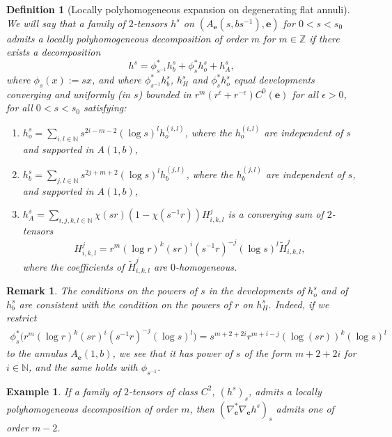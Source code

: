 \documentclass[12pt]{article}
\newtheorem{defn}[thm]{Definition}
\newtheorem{exmp}[thm]{Example}
\newtheorem{rem}[thm]{Remark}
\begin{document}
 \begin{defn}[Locally polyhomogeneous expansion on degenerating flat annuli]\label{homog expan annulus}
        We will say that a family of $2$-tensors $h^s$ on $(A_\mathbf{e}(s,bs^{-1}),\mathbf{e})$ for $0<s<s_0$ admits a \emph{locally polyhomogeneous decomposition of order $m$} for $m\in \mathbb{Z}$ if there exists a decomposition $$h^s = \phi_{s^{-1}}^*h^s_b + \phi_{s}^*h^s_o + h^s_{A},$$ where $\phi_s(x):= sx$, and where $\phi_{s^{-1}}^*h^s_b$, $h^s_{H}$ and $\phi_{s}^*h^s_o$ equal developments converging and uniformly (in $s$) bounded in $r^m(r^\epsilon+r^{-\epsilon})C^0(\mathbf{e})$ for all $\epsilon>0$, for all $0<s<s_0$ satisfying:
        \begin{enumerate}
            \item $h^s_o = \sum_{i,l\in \mathbb{N}} s^{2i-m-2}(\log s)^l h_o^{(i,l)}$, where the $h_o^{(i,l)}$ are independent of $s$ and supported in $A(1,b)$,
            \item $h^s_b = \sum_{j,l\in \mathbb{N}} s^{2j+m+2}(\log s)^l h_b^{(j,l)}$, where the $h_b^{(j,l)}$ are independent of $s$, and supported in $A(1,b)$,
            \item $h^s_{A} = \sum_{i,j,k,l\in \mathbb{N}}\chi(s r)(1-\chi(s^{-1} r)) H_{i,k,l}^j$ is a converging sum of $2$-tensors
            $$H_{i,k,l}^j = r^m(\log r)^k(sr)^i(s^{-1}r)^{-j} (\log s)^l\tilde{H}_{i,k,l}^j,$$ where the coefficients of $\tilde{H}_{i,k,l}^j$ are $0$-homogeneous.
        \end{enumerate}
    \end{defn}
        \begin{rem}\label{restriction polyhomogeneous}
        The conditions on the powers of $s$ in the developments of $h_o^s$ and of $h_b^s$ are consistent with the condition on the powers of $r$ on $h_H^s$. Indeed, if we restrict
        \begin{align}
            \phi_s^*\big(r^m(\log r)^k(sr)^i(s^{-1}r)^{-j} (\log s)^l\big) = s^{m+2+2i}r^{m+i-j}(\log (sr))^k(\log s)^l
        \end{align}
        to the annulus $A_\mathbf{e}(1,b)$, we see that it has power of $s$ of the form $m+2+2i$ for $i\in\mathbb{N}$, and the same holds with $\phi_{s^{-1}}$.
    \end{rem}
    
    \begin{exmp}
        If a family of $2$-tensors of class $C^2$, $(h^s)_s$, admits a locally polyhomogeneous decomposition of order $m$, then $(\nabla_{\mathbf{e}}^*\nabla_{\mathbf{e}} h^s)_s$ admits one of order $m-2$.
    \end{exmp}
    
\end{document}
